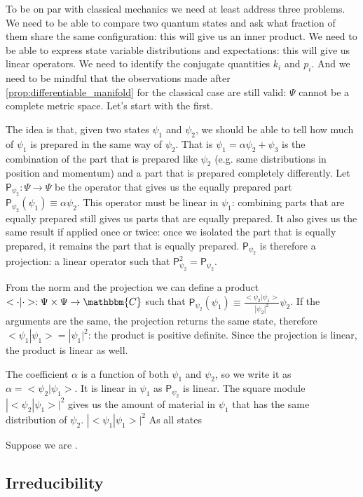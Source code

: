 \documentclass[aps,pra,10pt,twocolumn,floatfix,nofootinbib]{revtex4-1}
\numberwithin{equation}{section}
\theoremstyle{definition}
\begin{document}
To be on par with classical mechanics we need at least address three problems. We need to be able to compare two quantum states and ask what fraction of them share the same configuration: this will give us an inner product. We need to be able to express state variable distributions and expectations: this will give us linear operators. We need to identify the conjugate quantities $k_i$ and $p_i$. And we need to be mindful that the observations made after \ref{prop:differentiable_manifold} for the  classical case are still valid: $\Psi$ cannot be a complete metric space. Let's start with the first.

The idea is that, given two states $\psi_1$ and $\psi_2$, we should be able to tell how much of $\psi_1$ is prepared in the same way of $\psi_2$. That is $\psi_1 = \alpha \psi_2 + \psi_3$ is the combination of the part that is prepared like $\psi_2$ (e.g. same distributions in position and momentum) and a part that is prepared completely differently. Let $\mathsf{P}_{\psi_2} : \Psi \rightarrow \Psi$ be the operator that gives us the equally prepared part $\mathsf{P}_{\psi_2} (\psi_1) \equiv \alpha \psi_2$. This operator must be linear in $\psi_1$: combining parts that are equally prepared still gives us parts that are equally prepared. It also gives us the same result if applied once or twice: once we isolated the part that is equally prepared, it remains the part that is equally prepared. $\mathsf{P}_{\psi_2}$ is therefore a projection: a linear operator such that $\mathsf{P}^2_{\psi_2}= \mathsf{P}_{\psi_2}$.

From the norm and the projection we can define a product $< \cdot |\cdot> : \Psi \times \Psi \rightarrow \mathbbm{C}$ such that $\mathsf{P}_{\psi_2} (\psi_1) \equiv \frac{<\psi_2|\psi_1>}{|\psi_2|^2} \psi_2$. If the arguments are the same, the projection returns the same state, therefore $<\psi_1|\psi_1> = |\psi_1|^2$: the product is positive definite. Since the projection is linear, the product is linear as well. 

The coefficient $\alpha$ is a function of both $\psi_1$ and $\psi_2$, so we write it as $\alpha = <\psi_2|\psi_1>$. It is linear in $\psi_1$ as $\mathsf{P}_{\psi_2}$ is linear. The square module $|<\psi_2|\psi_1>|^2$ gives us the amount of material in $\psi_1$ that has the same distribution of $\psi_2$. $|<\psi_1|\psi_1>|^2$ As all states 

Suppose we are . 

\subsection{Irreducibility}
\end{document}

